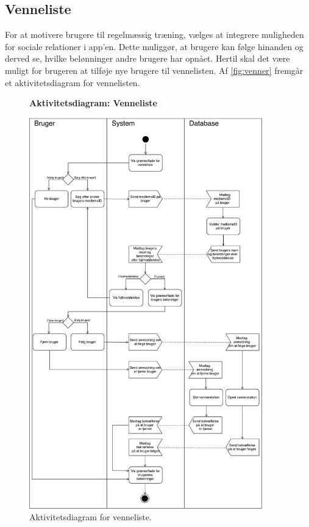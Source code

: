 \subsection*{Venneliste} 
For at motivere brugere til regelmæssig træning, vælges at integrere muligheden for sociale relationer i app'en. Dette muliggør, at brugere kan følge hinanden og derved se, hvilke belønninger andre brugere har opnået. Hertil skal det være muligt for brugeren at tilføje nye brugere til vennelisten. 
Af \autoref{fig:venner} fremgår et aktivitetsdiagram for vennelisten.

\begin{figure} [H]
\centering
\textbf{Aktivitetsdiagram: Venneliste}\par\medskip
\includegraphics[width=0.9\textwidth]{figures/aktivitetsdiagram/venner}
\caption{Aktivitetsdiagram for venneliste.}
\label{fig:venner}
\end{figure}


